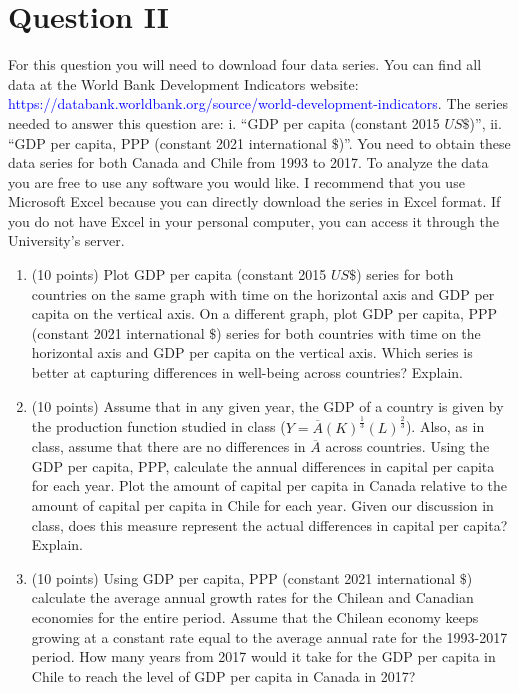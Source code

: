 \documentclass[letterpaper,12pt]{article}
\theoremstyle{dotlessS}
\begin{document}
\section*{Question II}
For this question you will need to download four data series. You can find all data at the World Bank Development Indicators website: \\
\textcolor{blue}{https://databank.worldbank.org/source/world-development-indicators}. The series needed to answer this question are: i. ``GDP per capita (constant 2015 $US\$$)'', ii. ``GDP per capita, PPP (constant 2021 international $\$$)''. You need to obtain these data series for both Canada and Chile from 1993 to 2017. To analyze the data you are free to use any software you would like. I recommend that you use Microsoft Excel because you can directly download the series in Excel format. If you do not have Excel in your personal computer, you can access it through the University's server.
\begin{enumerate}[label=\alph*]
\item (10 points) Plot GDP per capita (constant 2015 $US\$$) series for both countries on the same graph with time on the horizontal axis and GDP per capita on the vertical axis. On a different graph, plot GDP per capita, PPP (constant 2021 international $\$$) series for both countries with time on the horizontal axis and GDP per capita on the vertical axis. Which series is better at capturing differences in well-being across countries? Explain.
\item (10 points) Assume that in any given year, the GDP of a country is given by the production function studied in class ($Y=\overline{A}(K)^{\frac{1}{3}}(L)^{\frac{2}{3}}$). Also, as in class, assume that there are no differences in $\overline{A}$ across countries. Using the GDP per capita, PPP, calculate the annual differences in capital per capita for each year. Plot the amount of capital per capita in Canada relative to the amount of capital per capita in Chile for each year. Given our discussion in class, does this measure represent the actual differences in capital per capita? Explain.      
\item (10 points) Using  GDP per capita, PPP (constant 2021 international $\$$) calculate the average annual growth rates for the Chilean and Canadian economies for the entire period. Assume that the Chilean economy keeps growing at a constant rate equal to the average annual rate for the 1993-2017 period. How many years from 2017 would it take for the GDP per capita in Chile to reach the level of GDP per capita in Canada in 2017? 
\end{enumerate}  
\end{document}
